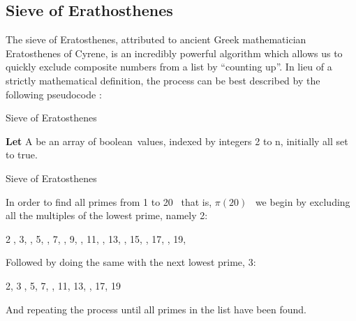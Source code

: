 \subsection{Sieve of Erathosthenes} \label{Sieve of Erastothenes}
The sieve of Eratosthenes, attributed to ancient Greek mathematician Eratosthenes of Cyrene, is an incredibly powerful algorithm which allows us to quickly exclude composite numbers from a list \citep[pp.332-335]{Horsley1772Sieve} by ``counting up''. In lieu of a strictly mathematical definition, the process can be best described by the following pseudocode \citep{WikiSieve}:
\begin{algorithm}
	\caption{Sieve of Eratosthenes}
		 \textbf{Let} A be an array of boolean\footnotemark\ values, indexed by integers 2 to n, initially all set to true. \newline
	
	\caption{Sieve of Eratosthenes \citep{WikiSieve}}
	\label{alg:Sieve}
\end{algorithm}

In order to find all primes from 1 to 20 \textendash\ that is, $\pi(20)$ \textendash\ we begin by excluding all the multiples of the lowest prime, namely 2:

\textcircled{2}, 3, , 5, , 7, , 9, , 11, , 13, , 15, , 17, , 19,  \par
Followed by doing the same with the next lowest prime, 3: \par
2, \textcircled{3}, 5, 7, , 11, 13, , 17, 19\par
And repeating the process until all primes in the list have been found.
	

